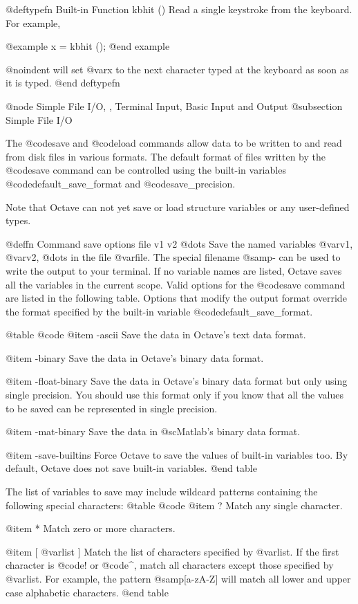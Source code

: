 @deftypefn {Built-in Function} {} kbhit ()
Read a single keystroke from the keyboard.  For example,

@example
x = kbhit ();
@end example

@noindent
will set @var{x} to the next character typed at the keyboard as soon as
it is typed.
@end deftypefn

@node Simple File I/O,  , Terminal Input, Basic Input and Output
@subsection Simple File I/O

The @code{save} and @code{load} commands allow data to be written to and
read from disk files in various formats.  The default format of files
written by the @code{save} command can be controlled using the built-in
variables @code{default_save_format} and @code{save_precision}.

Note that Octave can not yet save or load structure variables or any
user-defined types.

@deffn {Command} save options file v1 v2 @dots{}
Save the named variables @var{v1}, @var{v2}, @dots{} in the file
@var{file}.  The special filename @samp{-} can be used to write the
output to your terminal.  If no variable names are listed, Octave saves
all the variables in the current scope.  Valid options for the
@code{save} command are listed in the following table.  Options that
modify the output format override the format specified by the built-in
variable @code{default_save_format}.

@table @code
@item -ascii
Save the data in Octave's text data format.

@item -binary
Save the data in Octave's binary data format.

@item -float-binary
Save the data in Octave's binary data format but only using single
precision.  You should use this format only if you know that all the
values to be saved can be represented in single precision.

@item -mat-binary
Save the data in @sc{Matlab}'s binary data format.

@item -save-builtins
Force Octave to save the values of built-in variables too.  By default,
Octave does not save built-in variables.
@end table

The list of variables to save may include wildcard patterns containing
the following special characters:
@table @code
@item ?
Match any single character.

@item *
Match zero or more characters.

@item [ @var{list} ]
Match the list of characters specified by @var{list}.  If the first
character is @code{!} or @code{^}, match all characters except those
specified by @var{list}.  For example, the pattern @samp{[a-zA-Z]} will
match all lower and upper case alphabetic characters. 
@end table

